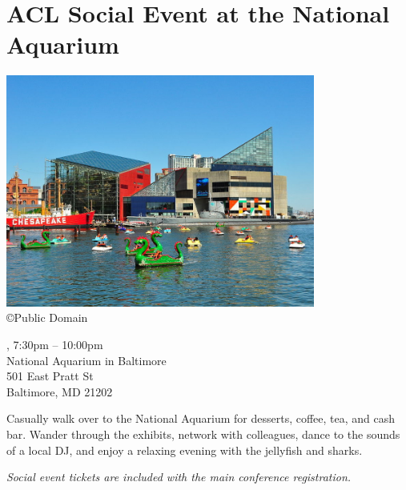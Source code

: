 \clearpage
\section[Social Event at the National Aquarium]{ACL Social Event at the National Aquarium}

\begin{center}

\includegraphics[width=4in]{content/tuesday/aqua.jpg} \\

{\tiny \copyright Public Domain}

\daydateyear, 7:30pm -- 10:00pm \vspace{1em}\\
National Aquarium in Baltimore\\
501 East Pratt St\\
Baltimore, MD 21202
\end{center}

\noindent Casually walk over to the National Aquarium for desserts,
coffee, tea, and cash bar. Wander through the exhibits, network with
colleagues, dance to the sounds of a local DJ, and enjoy a relaxing
evening with the jellyfish and sharks.

\noindent \emph{Social event tickets are included with the main
  conference registration.}

